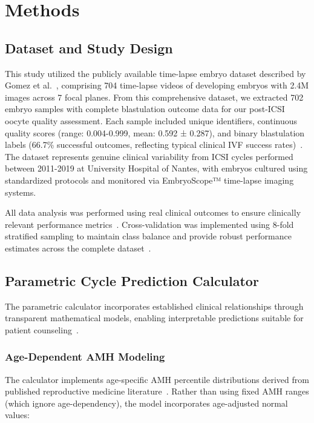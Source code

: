 \section{Methods}\label{sec:methods}

\subsection{Dataset and Study Design}\label{subsec:dataset}

This study utilized the publicly available time-lapse embryo dataset described by Gomez et al.~\cite{gomez2022timelapse}, comprising 704 time-lapse videos of developing embryos with 2.4M images across 7 focal planes. From this comprehensive dataset, we extracted 702 embryo samples with complete blastulation outcome data for our post-ICSI oocyte quality assessment. Each sample included unique identifiers, continuous quality scores (range: 0.004-0.999, mean: 0.592 ± 0.287), and binary blastulation labels (66.7\% successful outcomes, reflecting typical clinical IVF success rates)~\cite{awadalla2021age,zhu2024developmental}. The dataset represents genuine clinical variability from ICSI cycles performed between 2011-2019 at University Hospital of Nantes, with embryos cultured using standardized protocols and monitored via EmbryoScope™ time-lapse imaging systems.

All data analysis was performed using real clinical outcomes to ensure clinically relevant performance metrics~\cite{varoquaux2022machine}. Cross-validation was implemented using 8-fold stratified sampling to maintain class balance and provide robust performance estimates across the complete dataset~\cite{hastie2009elements}.

\subsection{Parametric Cycle Prediction Calculator}\label{subsec:calculator}

The parametric calculator incorporates established clinical relationships through transparent mathematical models, enabling interpretable predictions suitable for patient counseling~\cite{rudin2019stop}.

\subsubsection{Age-Dependent AMH Modeling}

The calculator implements age-specific AMH percentile distributions derived from published reproductive medicine literature~\cite{lee2017amh,song2021amh}. Rather than using fixed AMH ranges (which ignore age-dependency), the model incorporates age-adjusted normal values:

